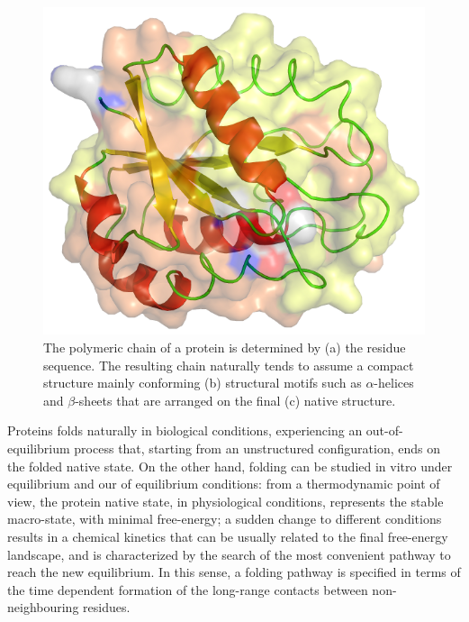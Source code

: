 \begin{figure}
\begin{center}
{\begin{minipage}{0.3\textwidth}
\includegraphics[width=\textwidth]{./img/1flv-600.eps}
\end{minipage}}
\end{center}
\caption{\label{fig:prot-structures}
The polymeric chain of a protein is determined by (a) the residue sequence.
The resulting chain naturally tends to assume a compact structure mainly
conforming (b) structural motifs such as  $\alpha$-helices and
$\beta$-sheets that are arranged on the final (c) native structure.}
\end{figure}

Proteins folds naturally in biological conditions, experiencing an
out-of-equilibrium process that, starting from an unstructured
configuration, ends on the folded native state. 
On the other hand, folding can be studied in vitro under equilibrium and our of
equilibrium conditions: 
from a thermodynamic point of view, the protein native state, in physiological
conditions, represents the stable macro-state, with minimal free-energy; a sudden change to different conditions results in a chemical kinetics that can be usually related to the final free-energy landscape,  and is characterized by the search of the most convenient pathway to reach the new equilibrium. 
In this sense, a folding pathway is specified in terms of the 
time dependent formation of the
long-range contacts between non-neighbouring  residues. 

